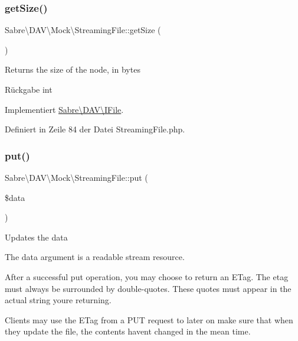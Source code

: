 \subsubsection{\texorpdfstring{get\+Size()}{getSize()}}
{\footnotesize\ttfamily Sabre\textbackslash{}\+D\+A\+V\textbackslash{}\+Mock\textbackslash{}\+Streaming\+File\+::get\+Size (\begin{DoxyParamCaption}{ }\end{DoxyParamCaption})}

Returns the size of the node, in bytes

\begin{DoxyReturn}{Rückgabe}
int 
\end{DoxyReturn}


Implementiert \mbox{\hyperlink{interface_sabre_1_1_d_a_v_1_1_i_file_aa1534e00805f45d9282de9c699dbe178}{Sabre\textbackslash{}\+D\+A\+V\textbackslash{}\+I\+File}}.



Definiert in Zeile 84 der Datei Streaming\+File.\+php.

\mbox{\label{class_sabre_1_1_d_a_v_1_1_mock_1_1_streaming_file_a78ce92fdea212d201f097698c0c5a1a8}} 
\subsubsection{\texorpdfstring{put()}{put()}}
{\footnotesize\ttfamily Sabre\textbackslash{}\+D\+A\+V\textbackslash{}\+Mock\textbackslash{}\+Streaming\+File\+::put (\begin{DoxyParamCaption}\item[{}]{\$data }\end{DoxyParamCaption})}

Updates the data

The data argument is a readable stream resource.

After a successful put operation, you may choose to return an E\+Tag. The etag must always be surrounded by double-\/quotes. These quotes must appear in the actual string you\textquotesingle{}re returning.

Clients may use the E\+Tag from a P\+UT request to later on make sure that when they update the file, the contents haven\textquotesingle{}t changed in the mean time.

